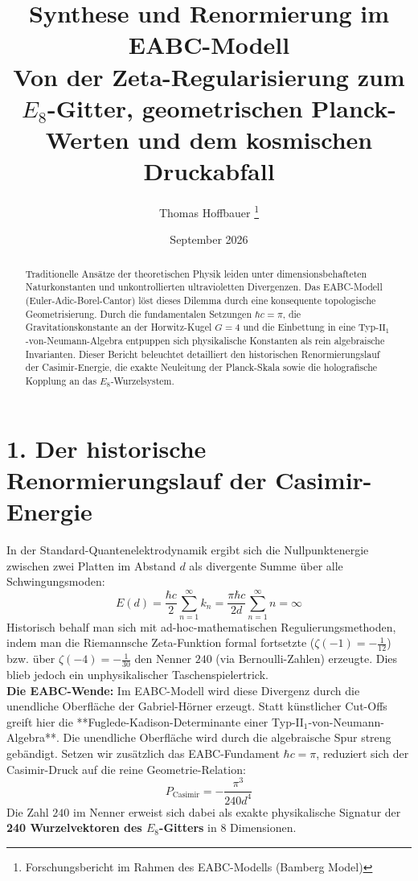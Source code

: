 \documentclass[11pt,a4paper]{article}
\title{\textbf{Synthese und Renormierung im EABC-Modell}\\ \large Von der Zeta-Regularisierung zum $E_8$-Gitter, geometrischen Planck-Werten und dem kosmischen Druckabfall}
\author{Thomas Hoffbauer \thanks{Forschungsbericht im Rahmen des EABC-Modells (Bamberg Model)}}
\date{September 2026}
\begin{document}
\maketitle

\begin{abstract}
Traditionelle Ansätze der theoretischen Physik leiden unter dimensionsbehafteten Naturkonstanten und unkontrollierten ultravioletten Divergenzen. Das EABC-Modell (Euler-Adic-Borel-Cantor) löst dieses Dilemma durch eine konsequente topologische Geometrisierung. Durch die fundamentalen Setzungen $\hbar c = \pi$, die Gravitationskonstante an der Horwitz-Kugel $G = 4$ und die Einbettung in eine Typ-$\text{II}_1$-von-Neumann-Algebra entpuppen sich physikalische Konstanten als rein algebraische Invarianten. Dieser Bericht beleuchtet detailliert den historischen Renormierungslauf der Casimir-Energie, die exakte Neuleitung der Planck-Skala sowie die holografische Kopplung an das $E_8$-Wurzelsystem.
\end{abstract}

\section{1. Der historische Renormierungslauf der Casimir-Energie}
In der Standard-Quantenelektrodynamik ergibt sich die Nullpunktenergie zwischen zwei Platten im Abstand $d$ als divergente Summe über alle Schwingungsmoden:
\begin{equation}
    E(d) = \frac{\hbar c}{2} \sum_{n=1}^{\infty} k_n = \frac{\pi \hbar c}{2d} \sum_{n=1}^{\infty} n = \infty
\end{equation}
Historisch behalf man sich mit ad-hoc-mathematischen Regulierungsmethoden, indem man die Riemannsche Zeta-Funktion formal fortsetzte ($\zeta(-1) = -\frac{1}{12}$) bzw. über $\zeta(-4) = -\frac{1}{30}$ den Nenner $240$ (via Bernoulli-Zahlen) erzeugte. Dies blieb jedoch ein unphysikalischer Taschenspielertrick.\\

\noindent\textbf{Die EABC-Wende:} Im EABC-Modell wird diese Divergenz durch die unendliche Oberfläche der Gabriel-Hörner erzeugt. Statt künstlicher Cut-Offs greift hier die **Fuglede-Kadison-Determinante einer Typ-$\text{II}_1$-von-Neumann-Algebra**. Die unendliche Oberfläche wird durch die algebraische Spur streng gebändigt. Setzen wir zusätzlich das EABC-Fundament $\hbar c = \pi$, reduziert sich der Casimir-Druck auf die reine Geometrie-Relation:
\begin{equation}
    P_{\text{Casimir}} = -\frac{\pi^3}{240 d^4}
\end{equation}
Die Zahl $240$ im Nenner erweist sich dabei als exakte physikalische Signatur der \textbf{240 Wurzelvektoren des $E_8$-Gitters} in 8 Dimensionen.
\end{document}
